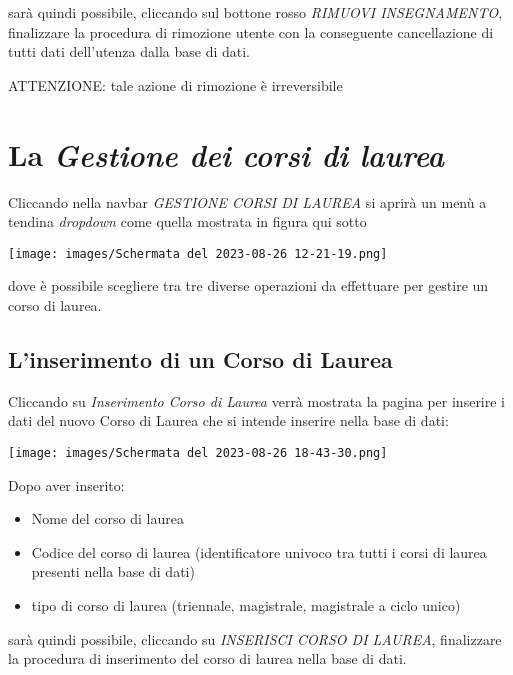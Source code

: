 \documentclass{article}
\newcommand{\alert}[0]{\textcolor{red}{\faExclamationCircle}}
\begin{document}
    sarà quindi possibile, cliccando sul bottone rosso \textit{RIMUOVI INSEGNAMENTO}, finalizzare la procedura di rimozione utente con la conseguente cancellazione di tutti dati dell'utenza dalla base di dati.

    \alert ATTENZIONE: tale azione di rimozione è irreversibile

    \section{La \textit{Gestione dei corsi di laurea}}

    Cliccando nella navbar \textit{GESTIONE CORSI DI LAUREA} si aprirà un menù a tendina \textit{dropdown} come quella mostrata in figura qui sotto
    \begin{center}
        \texttt{[image: images/Schermata del 2023-08-26 12-21-19.png]}
    \end{center}
    dove è possibile scegliere tra tre diverse operazioni da effettuare per gestire un corso di laurea.
    \subsection{L'inserimento di un Corso di Laurea}
    Cliccando su \textit{Inserimento Corso di Laurea} verrà mostrata la pagina per inserire i dati del nuovo Corso di Laurea che si intende inserire nella base di dati:

    \begin{center}
        \texttt{[image: images/Schermata del 2023-08-26 18-43-30.png]}
    \end{center}
    Dopo aver inserito:
    \begin{itemize}
        \item Nome del corso di laurea
        \item Codice del corso di laurea (identificatore univoco tra tutti i corsi di laurea presenti nella base di dati)
        \item tipo di corso di laurea (triennale, magistrale, magistrale a ciclo unico)
    \end{itemize}
    sarà quindi possibile, cliccando su \textit{INSERISCI CORSO DI LAUREA}, finalizzare la procedura di inserimento del corso di laurea nella base di dati.
\end{document}
